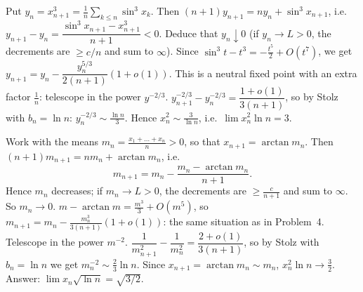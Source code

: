 \documentclass[11pt,a4paper]{article}
\begin{document}
 Put $y_n=x_{n+1}^3=\frac1n\sum_{k\le n}\sin^3x_k$. Then $(n+1)y_{n+1}=ny_n+\sin^3x_{n+1}$, i.e.\ $y_{n+1}-y_n=\dfrac{\sin^3x_{n+1}-x_{n+1}^3}{n+1}<0$. Deduce that $y_n\downarrow0$ (if $y_n\to L>0$, the decrements are $\ge c/n$ and sum to $\infty$).
 Since $\sin^3t-t^3=-\frac{t^5}2+O(t^7)$, we get $y_{n+1}=y_n-\dfrac{y_n^{5/3}}{2(n+1)}(1+o(1))$. This is a neutral fixed point with an extra factor $\frac1n$: telescope in the power $y^{-2/3}$.
 $y_{n+1}^{-2/3}-y_n^{-2/3}=\dfrac{1+o(1)}{3(n+1)}$, so by Stolz with $b_n=\ln n$: $y_n^{-2/3}\sim\frac{\ln n}3$. Hence $x_n^2\sim\frac3{\ln n}$, i.e.\ $\lim x_n^2\ln n=3$.

 Work with the means $m_n=\frac{x_1+\dots+x_n}n>0$, so that $x_{n+1}=\arctan m_n$. Then $(n+1)m_{n+1}=nm_n+\arctan m_n$, i.e.
\[m_{n+1}=m_n-\frac{m_n-\arctan m_n}{n+1}.\]
Hence $m_n$ decreases; if $m_n\to L>0$, the decrements are $\ge\frac c{n+1}$ and sum to $\infty$. So $m_n\to0$.
 $m-\arctan m=\frac{m^3}3+O(m^5)$, so $m_{n+1}=m_n-\frac{m_n^3}{3(n+1)}(1+o(1))$: the same situation as in Problem~4. Telescope in the power $m^{-2}$.
 $\dfrac1{m_{n+1}^2}-\dfrac1{m_n^2}=\dfrac{2+o(1)}{3(n+1)}$, so by Stolz with $b_n=\ln n$ we get $m_n^{-2}\sim\frac23\ln n$. Since $x_{n+1}=\arctan m_n\sim m_n$, $x_n^2\ln n\to\frac32$. Answer: $\lim x_n\sqrt{\ln n}=\sqrt{3/2}$.
\end{document}

